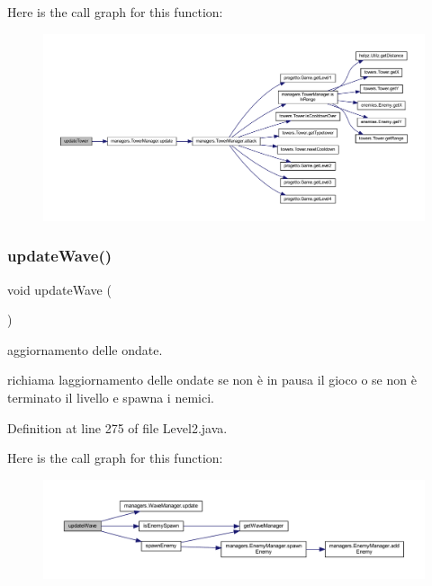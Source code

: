 Here is the call graph for this function\+:
\nopagebreak
\begin{figure}[H]
\begin{center}
\leavevmode
\includegraphics[width=350pt]{classscenes_1_1_level2_ae4fd4a959e4d782a5e7ac0eff77ba27f_cgraph}
\end{center}
\end{figure}
\mbox{\label{classscenes_1_1_level2_ab424ab29e7ab4733f2efd1e6ef3f13b1}} 
\subsubsection{\texorpdfstring{update\+Wave()}{updateWave()}}
{\footnotesize\ttfamily void update\+Wave (\begin{DoxyParamCaption}{ }\end{DoxyParamCaption})}



aggiornamento delle ondate. 

richiama l\textquotesingle{}aggiornamento delle ondate se non è in pausa il gioco o se non è terminato il livello e spawna i nemici. 

Definition at line 275 of file Level2.\+java.

Here is the call graph for this function\+:
\nopagebreak
\begin{figure}[H]
\begin{center}
\leavevmode
\includegraphics[width=350pt]{classscenes_1_1_level2_ab424ab29e7ab4733f2efd1e6ef3f13b1_cgraph}
\end{center}
\end{figure}


